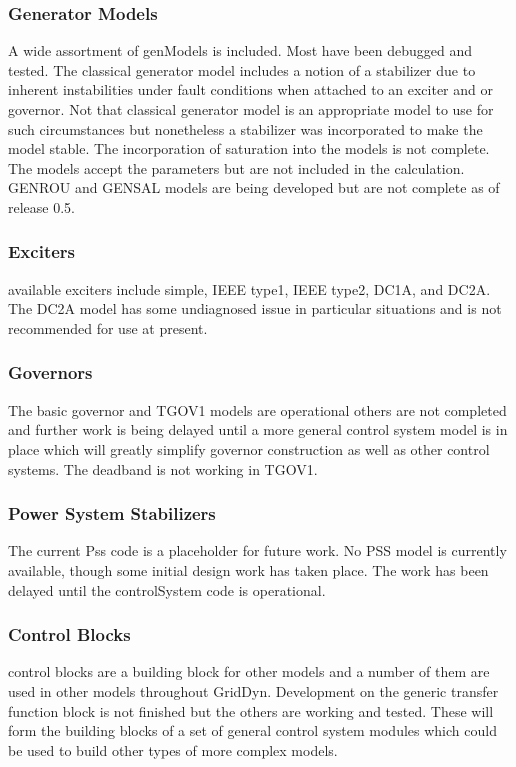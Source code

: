 \documentclass[12pt]{article} %
\begin{document}
\subsubsection{Generator Models}
A wide assortment of genModels is included.  Most have been debugged and tested.  The classical generator model includes a notion of a stabilizer due to inherent instabilities under fault conditions when attached to an exciter and or governor.  Not that classical generator model is an appropriate model to use for such circumstances but nonetheless a stabilizer was incorporated to make the model stable.  The incorporation of saturation into the models is not complete.  The models accept the parameters but are not included in the calculation.  GENROU and GENSAL models are being developed but are not complete as of release 0.5.

\subsubsection{Exciters}
available exciters include simple, IEEE type1,  IEEE type2, DC1A, and DC2A.  The DC2A model has some undiagnosed issue in particular situations and is not recommended for use at present.

\subsubsection{Governors}
The basic governor and TGOV1 models are operational others are not completed and further work is being delayed until a more general control system model is in place which will greatly simplify governor construction as well as other control systems.  The deadband is not working in TGOV1.

\subsubsection{Power System Stabilizers}
The current Pss code is a placeholder for future work.  No PSS model is currently available, though some initial design work has taken place.  The work has been delayed until the controlSystem code is operational.

\subsubsection{Control Blocks}
control blocks are a building block for other models and a number of them are used in other models throughout GridDyn.
Development on the generic transfer function block is not finished but the others are working and tested.  These will form the building blocks of a set of general control system modules which could be used to build other types of more complex models.
\end{document}
